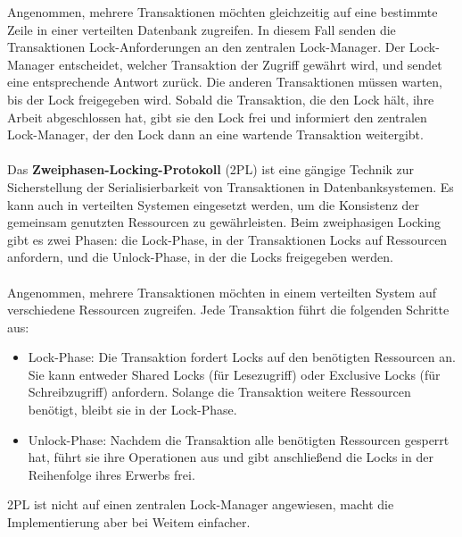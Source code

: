 \documentclass[../vs-script-first-v01.tex]{subfiles}
\begin{document}
Angenommen, mehrere Transaktionen möchten gleichzeitig auf eine bestimmte Zeile in einer verteilten Datenbank zugreifen. In diesem Fall senden die Transaktionen Lock-Anforderungen an den zentralen Lock-Manager. Der Lock-Manager entscheidet, welcher Transaktion der Zugriff gewährt wird, und sendet eine entsprechende Antwort zurück. Die anderen Transaktionen müssen warten, bis der Lock freigegeben wird. Sobald die Transaktion, die den Lock hält, ihre Arbeit abgeschlossen hat, gibt sie den Lock frei und informiert den zentralen Lock-Manager, der den Lock dann an eine wartende Transaktion weitergibt.
\\\\
Das \textbf{Zweiphasen-Locking-Protokoll} (2PL) ist eine gängige Technik zur Sicherstellung der Serialisierbarkeit von Transaktionen in Datenbanksystemen. Es kann auch in verteilten Systemen eingesetzt werden, um die Konsistenz der gemeinsam genutzten Ressourcen zu gewährleisten. Beim zweiphasigen Locking gibt es zwei Phasen: die Lock-Phase, in der Transaktionen Locks auf Ressourcen anfordern, und die Unlock-Phase, in der die Locks freigegeben werden.
\\\\
Angenommen, mehrere Transaktionen möchten in einem verteilten System auf verschiedene Ressourcen zugreifen. Jede Transaktion führt die folgenden Schritte aus:
\begin{itemize}
\item Lock-Phase: Die Transaktion fordert Locks auf den benötigten Ressourcen an. Sie kann entweder Shared Locks (für Lesezugriff) oder Exclusive Locks (für Schreibzugriff) anfordern. Solange die Transaktion weitere Ressourcen benötigt, bleibt sie in der Lock-Phase.
\item Unlock-Phase: Nachdem die Transaktion alle benötigten Ressourcen gesperrt hat, führt sie ihre Operationen aus und gibt anschließend die Locks in der Reihenfolge ihres Erwerbs frei.
\end{itemize}
2PL ist nicht auf einen  zentralen Lock-Manager angewiesen, macht die Implementierung aber bei Weitem einfacher. 
\end{document}
